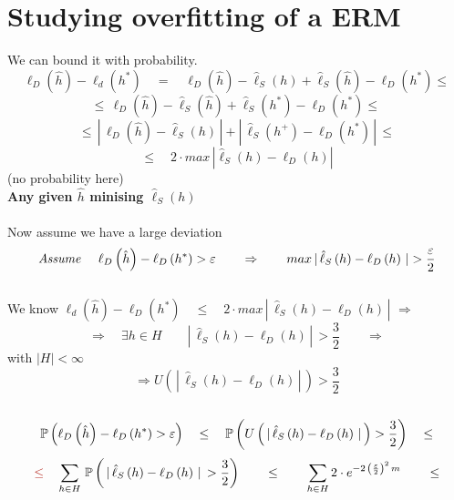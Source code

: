 \documentclass[../main.tex]{subfiles}
\begin{document}
\section{Studying overfitting of a ERM}
We can bound it with probability.\\
$$
\ell_D \left(\hat{h}\right) 
-\ell_d \left(h^*\right)
\quad
 = 
 \quad 
\ell_D \left(\hat{h}\right) - 
\hat{\ell}_S\left( h \right)
+ 
\hat{\ell}_S \left( \hat{h} \right)
- \ell_D\left( h^* \right) \leq 
$$
$$
\leq \, \ell_D \left(\hat{h}\right) - 
\hat{\ell}_S\left( \hat{h} \right)
+ 
\hat{\ell}_S \left( h^* \right)
- \ell_D\left( h^* \right) \leq \,
$$
$$
\leq \, | \, \ell_D\left(\hat{h}\right) - \hat{\ell}_S\left(h\right) \, | + | \, \hat{\ell}_S\left(h^+\right) - \ell_D\left(h^*\right) \, |\, \leq
$$
$$
\leq \quad 2 \cdot max \, |\hat{\ell}_S\left(h\right) - \ell_D\left(h\right) |
$$
(no probability here)\\
\textbf{Any given $\hat{h}$ minising $\hat{\ell}_S\left(h\right)$}
\\\\
Now assume we have a large deviation
\\
$$
\textit{Assume \quad } \ell_D\left(\hat{h}\right) - \ell_D \left(h^* \right) > \varepsilon \qquad \Rightarrow \qquad max \, | \, \hat{\ell}_S\left(h\right) - \ell_D \left(h\right) \, | > \frac{\varepsilon}{2}
$$
\\
We know $\ell_d\left(\hat{h}\right) - \ell_D\left(h^*\right) 
\quad \leq \quad 2
 \cdot max \,|\, \hat{\ell}_S \left(h\right) - \ell_D\left(h\right) \, |$ \quad $\Rightarrow$
\\
$$
\Rightarrow \quad \exists h \in H \qquad | \, \hat{\ell}_S\left(h\right) - \ell_D\left(h \right) \, | \, > \frac{3}{2} \qquad \Rightarrow
$$
with $|H| < \infty$
$$
\Rightarrow U \left( \, | \, \hat{\ell}_S\left(h\right) - \ell_D \left(h\right) \, | \, \right) > \frac{3}{2}
$$
\\
$$
\mathbb{P} \left( \ell_D \left(\hat{h}\right) - \ell_D \left( h^* \right) 
> 
\varepsilon \right) \quad \leq \quad \mathbb{P} \left( U \left( \, | \, \hat{\ell}_S\left(h\right) - \ell_D \left(h\right) \, | \, \right) > \frac{3}{2} \right) \quad \leq
$$
$$
\red{\leq}  \quad \sum_{h \in H}{} \, \barra{P} \left( \,  | \, \hat{\ell}_S\left(h\right) - \ell_D \left(h\right) \, |  \, > \frac{3}{2}  \right) \qquad \leq \qquad \sum_{h \in H}{} 2 \cdot e^{-2 \, \left(\frac{\varepsilon}{2}\right)^2 \, m} \qquad \leq 
$$
 
\end{document}
